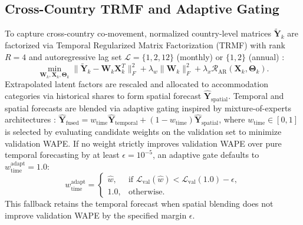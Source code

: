 \documentclass[sigconf]{acmart}
\begin{document}
\subsection{Cross-Country TRMF and Adaptive Gating}
\label{sec:trmf}
To capture cross-country co-movement, normalized country-level matrices $\widetilde{\mathbf{Y}}_k$ are factorized via Temporal Regularized Matrix Factorization (TRMF) with rank $R=4$ and autoregressive lag set $\mathcal{L}=\{1,2,12\}$ (monthly) or $\{1,2\}$ (annual) \cite{yu2016trmf}:
\begin{equation}
\min_{\mathbf{W}_k, \mathbf{X}_k, \boldsymbol{\Theta}_k} \|\widetilde{\mathbf{Y}}_k - \mathbf{W}_k \mathbf{X}_k^T\|_F^2 + \lambda_w \|\mathbf{W}_k\|_F^2 + \lambda_x \mathcal{R}_{\text{AR}}(\mathbf{X}_k, \boldsymbol{\Theta}_k).
\label{eq:trmf_objective}
\end{equation}
Extrapolated latent factors are rescaled and allocated to accommodation categories via historical shares to form spatial forecast $\hat{\mathbf{Y}}_{\text{spatial}}$. Temporal and spatial forecasts are blended via adaptive gating inspired by mixture-of-experts architectures \cite{jacobs1991adaptive,shazeer2017moe}: $\hat{\mathbf{Y}}_{\text{fused}} = w_{\text{time}} \hat{\mathbf{Y}}_{\text{temporal}} + (1 - w_{\text{time}}) \hat{\mathbf{Y}}_{\text{spatial}}$, where $w_{\text{time}} \in [0, 1]$ is selected by evaluating candidate weights on the validation set to minimize validation WAPE. If no weight strictly improves validation WAPE over pure temporal forecasting by at least $\epsilon=10^{-5}$, an adaptive gate defaults to $w_{\text{time}}^{\text{adapt}}=1.0$:
\begin{equation}
w_{\text{time}}^{\text{adapt}} = \begin{cases}
\hat{w}, & \text{if } \mathcal{L}_{\text{val}}(\hat{w}) < \mathcal{L}_{\text{val}}(1.0) - \epsilon, \\
1.0, & \text{otherwise}.
\end{cases}
\label{eq:adaptive_fallback}
\end{equation}
This fallback retains the temporal forecast when spatial blending does not improve validation WAPE by the specified margin $\epsilon$.
\end{document}
